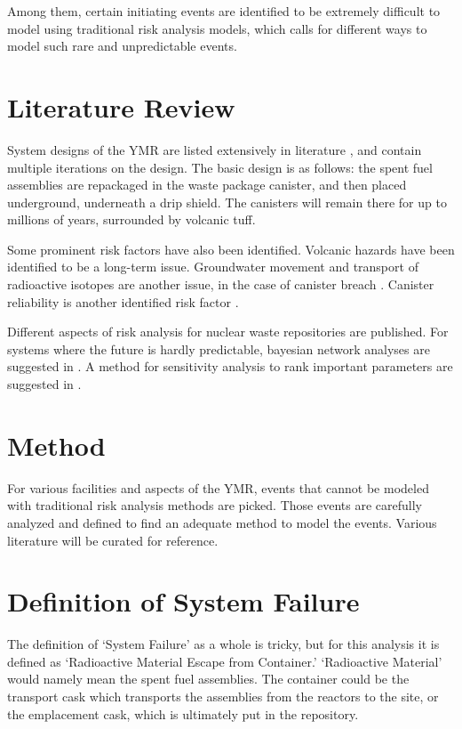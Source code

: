\documentclass[12pt]{article}
\begin{document}
Among them, certain initiating events are identified to be extremely difficult
to model using traditional risk analysis models, which calls for different
ways to model such rare and unpredictable events. 


\section{Literature Review}
System designs of the \gls{YMR} are listed extensively in literature \cite{u.s._department_of_energy_office_of_civilian_radioactive_waste_management_national_2008, wilson_total-system_1994, rechard_evolution_2014, u.s._department_of_energy_yucca_2002}, and contain multiple
iterations on the design. The basic design is as follows: the spent fuel assemblies
are repackaged in the waste package canister, and then placed underground,
underneath a drip shield. The canisters will remain there for up to millions of years,
surrounded by volcanic tuff.

Some prominent risk factors have also been identified. Volcanic hazards \cite{ho_risk_1992, smith_area_1990}
have been identified to be a long-term issue. Groundwater movement and transport of 
radioactive isotopes are another issue, in the case of canister breach \cite{robison_ground-water_1984, quade_fossil_1995}.  Canister reliability is another
identified risk factor \cite{whipple_can_1996, rutqvist_analysis_2003}.

Different aspects of risk analysis for nuclear waste repositories are published.
For systems where the future is hardly predictable, bayesian network analyses are 
suggested in \cite{lee_application_2006}. A method for sensitivity analysis
to rank important parameters are suggested in \cite{mohanty_cdf_2001}.


\section{Method}

For various facilities and aspects of the \gls{YMR}, events that
cannot be modeled with traditional risk analysis methods are picked.
Those events are carefully analyzed and defined to find an adequate
method to model the events. Various literature will be curated for
reference.

\section{Definition of System Failure}
The definition of `System Failure' as a whole is tricky, but for this analysis it is defined
as `Radioactive Material Escape from Container.'
`Radioactive Material' would namely mean the spent fuel assemblies.
The container could be the transport cask which transports the assemblies from
the reactors to the site, or the emplacement cask, which is ultimately put in the repository.
\end{document}
